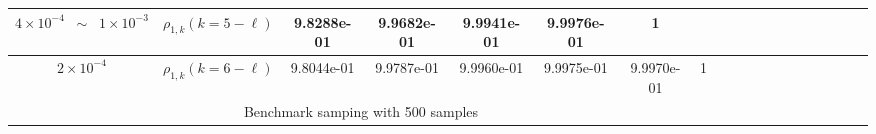 \begin{table}[ht]
{\begin{tabular}{|c|c|c|c|c|c|c|c|c|c|c|c|c|c|c|c|c|c|c|}
\hline
\cline{2-7}	
\multirow{1}{*}{$4\times 10^{-4}\;\;\sim \;\;1\times 10^{-3}$}&\multicolumn{1}{|c|}{$\rho_{1,k} (k=5-\ell)$}&9.8288e-01&9.9682e-01&9.9941e-01  &9.9976e-01&1 &\\
\hline
\cline{2-8}	
\multirow{1}{*}{$2\times 10^{-4}$}&\multicolumn{1}{|c|}{$\rho_{1,k} (k=6-\ell)$}&9.8044e-01&9.9787e-01&9.9960e-01&9.9975e-01&9.9970e-01   &1\\
\hline
\multicolumn{8}{|c|}{Benchmark samping with 500 samples} \\
\hline

\end{tabular}}
\end{table}
